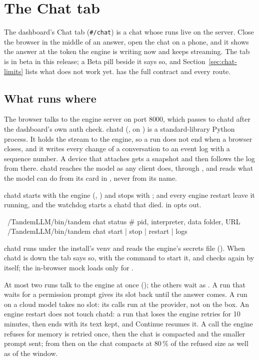 \chapter{The Chat tab}\label{ch:chat}

The dashboard's Chat tab (\texttt{\#/chat}) is a chat whose runs live on the server. Close the browser in the middle of an answer, open the chat on a phone, and it shows the answer at the token the engine is writing now and keeps streaming. The tab is in beta in this release; a Beta pill beside it says so, and Section~\ref{sec:chat-limits} lists what does not work yet.  has the full contract and every route.

\section{What runs where}

The browser talks to the engine server on port 8000, which passes  to chatd after the dashboard's own auth check. chatd (, on ) is a standard-library Python process. It holds the stream to the engine, so a run does not end when a browser closes, and it writes every change of a conversation to an event log with a sequence number. A device that attaches gets a snapshot and then follows the log from there. chatd reaches the model as any client does, through , and reads what the model can do from its card in , never from its name.

chatd starts with the engine (, ) and stops with ;  and every engine restart leave it running, and the watchdog starts a chatd that died.  in  opts out.

\begin{shell}
~/TandemLLM/bin/tandem chat status   # pid, interpreter, data folder, URL
~/TandemLLM/bin/tandem chat start | stop | restart | logs
\end{shell}

chatd runs under the install's venv and reads the engine's secrets file (). When chatd is down the tab says so, with the command to start it, and checks again by itself; the in-browser mock loads only for .

At most two runs talk to the engine at once (); the others wait as . A run that waits for a permission prompt gives its slot back until the answer comes. A run on a cloud model takes no slot: its calls run at the provider, not on the box. An engine restart does not touch chatd: a run that loses the engine retries for 10 minutes, then ends  with its text kept, and Continue resumes it. A call the engine refuses for memory is retried once, then the chat is compacted and the smaller prompt sent; from then on the chat compacts at 80\,\% of the refused size as well as of the window.

